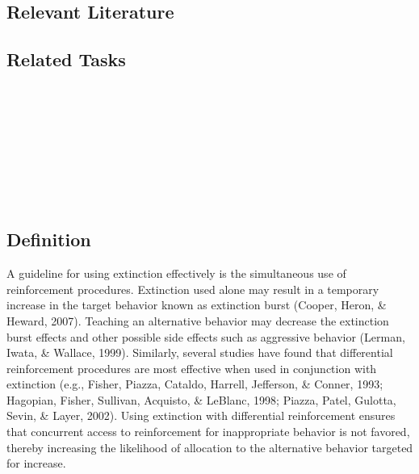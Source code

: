 \subsection{Relevant Literature}
\begin{refsection}
\nocite{lerman1995prevalence,
    athens2010investigation}
\printbibliography[heading=none]
\end{refsection}
%
\subsection{Related Tasks} 
\fourcThree{}\\
\fourdEighteen{}\\
\fourdNineteen{}\\
\fourjSix{}\\
\fourjSeven{}\\
\fourjNine{}\\
\fourjTen{}\\
%
%
%
%
%
%
%
%
%
%
%
%
%
%
\section[\fourdNineteen{}]{\fourdNineteen{}%
              }
\subsection{Definition}
A guideline for using extinction effectively is the simultaneous use of reinforcement procedures. Extinction used alone may result in a temporary increase in the target behavior known as extinction burst (Cooper, Heron, \& Heward, 2007). Teaching an alternative behavior may decrease the extinction burst effects and other possible side effects such as aggressive behavior (Lerman, Iwata, \& Wallace, 1999). Similarly, several studies have found that differential reinforcement procedures are most effective when used in conjunction with extinction (e.g., Fisher, Piazza, Cataldo, Harrell, Jefferson, \& Conner, 1993; Hagopian, Fisher, Sullivan, Acquisto, \& LeBlanc, 1998; Piazza, Patel, Gulotta, Sevin, \& Layer, 2002).  Using extinction with differential reinforcement ensures that concurrent access to reinforcement for inappropriate behavior is not favored, thereby increasing the likelihood of allocation to the alternative behavior targeted for increase.

